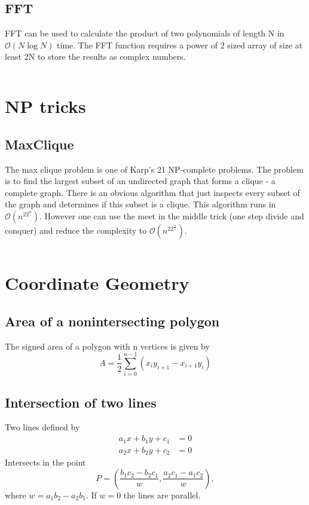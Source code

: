 \documentclass[8pt,a4paper,landscape,oneside]{amsart}
\newcommand{\codej}[1]{\inputminted[fontsize=\large,tabsize=2,baselinestretch=1]{java}{src/#1}}
\newcommand{\codep}[1]{\inputminted[fontsize=\large,tabsize=2,baselinestretch=1]{py}{src/#1}}
\newcommand{\bigO}{\mathcal{O}}
\begin{document}
\begin{multicols*}{2}
\begin{large}
    \subsection{FFT}
        FFT can be used to calculate the product of two polynomials of length N in $\bigO(N\log N)$ time. The FFT function requires a power of 2 sized array of size at least 2N to store the results as complex numbers.
        \codep{misc/fft.py}

\section{NP tricks}
    \subsection{MaxClique}
        The max clique problem is one of Karp's 21 NP-complete problems. The problem is to find the largest subset of an undirected graph that forms a clique - a complete graph. There is an obvious algorithm that just inspects every subset of the graph and determines if this subset is a clique. This algorithm runs in $\bigO(n^22^n)$. However one can use the meet in the middle trick (one step divide and conquer) and reduce the complexity to $\bigO(n^22^{\frac{n}{2}})$.
        \codej{npcomplete/MaxClique.java}
\section{Coordinate Geometry}
    \subsection{Area of a nonintersecting polygon}
        The signed area of a polygon with n vertices is given by
        $$A = \frac{1}{2}\sum_{i=0}^{n-1}(x_iy_{i+1} - x_{i+1}y_i)$$
    \subsection{Intersection of two lines}
        Two lines defined by
        \begin{align*}
            a_1x + b_1y + c_1 &= 0 \\
            a_2x + b_2y + c_2 &= 0
        \end{align*}
        Intersects in the point
        $$P = (\frac{b_1c_2 - b_2c_1}{w}, \frac{a_2c_1 - a_1c_2}{w}),$$
        where $w = a_1b_2 - a_2b_1$. If $w = 0$ the lines are parallel.

\end{large}
\end{multicols*}
\end{document}
